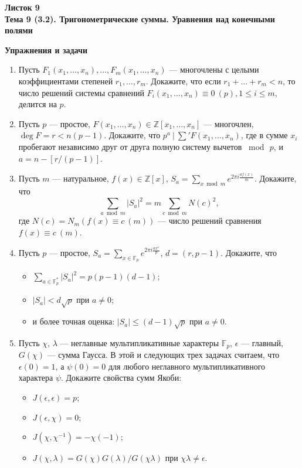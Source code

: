 \documentclass[a4paper, 11pt]{article}
\begin{document}
\begin{center} \Large \bf Листок 9\\ Тема 9 (3.2). Тригонометрические суммы. Уравнения над конечными полями \end{center}

\noindent\textbf{Упражнения и задачи}

\begin{enumerate}[topsep=0pt]
    
    \item Пусть $F_1(x_1,\dots, x_n), \dots, F_m(x_1,\dots, x_n)$ --- многочлены с целыми коэффициентами степеней $r_1, \dots, r_m$. Докажите, что если $r_1+\dots+r_m < n$, то число решений системы сравнений $F_i(x_1,\dots, x_n) \equiv 0\ (p), 1\leqslant i \leqslant m$, делится на $p$. %
    
    \item Пусть $p$ --- простое, $F(x_1, \dots, x_n)\in \mathbb{Z}[x_1,\dots,x_n]$ --- многочлен, $\deg F = r < n(p-1)$. Докажите, что $p^a\ |\ \sum' F(x_1, \dots, x_n)$, где в сумме $x_i$ пробегают независимо друг от друга полную систему вычетов $\bmod\, p$, и $a=n-[r/(p-1)]$. %

    \item Пусть $m$ --- натуральное, $f(x) \in \mathbb{Z}[x]$, $S_a = \sum\limits_{x \bmod m} e^{2\pi i \frac{af(x)}{m}}$. Докажите, что
    $$
        \sum\limits_{a \bmod m} |S_a|^2 = m \sum\limits_{c \bmod m} N(c)^2,
    $$
    где $N(c) = N_m\left(f(x) \equiv c\ (m)\right)$ --- число решений сравнения $f(x) \equiv c\ (m)$.

    \item Пусть $p$ --- простое, $S_a = \sum\limits_{x \in \mathbb{F}_p} e^{2\pi i \frac{a x^r}{p}}$, $d=(r,p-1)$. Докажите, что 
    \begin{itemize}[noitemsep,topsep=0pt]
        \item $\sum\limits_{a \in \mathbb{F}_p^*} |S_a|^2 = p(p-1)(d-1)$;
        \item $|S_a| < d \sqrt{p}$ при $a \neq 0$;
        \item и более точная оценка: $|S_a| \leqslant (d-1) \sqrt{p}$ при $a \neq 0$.
    \end{itemize} %

    \item Пусть $\chi$, $\lambda$ --- неглавные мультипликативные характеры $\mathbb{F}_p$, $\epsilon$ --- главный, $G(\chi)$ --- сумма Гаусса. В этой и следующих трех задачах считаем, что $\epsilon(0)=1$, а $\psi(0)=0$ для любого неглавного мультипликативного характера $\psi$. Докажите свойства сумм Якоби:
        \begin{itemize}[topsep=0pt]
            \item $J(\epsilon,\epsilon)=p$;
            \item $J(\epsilon,\chi)=0$;
            \item $J(\chi,\chi^{-1})=-\chi(-1)$;
            \item $J(\chi,\lambda) = G(\chi)G(\lambda)/G(\chi\lambda)$ при $\chi\lambda \neq \epsilon$.
        \end{itemize} %


\end{enumerate}
\end{document}
